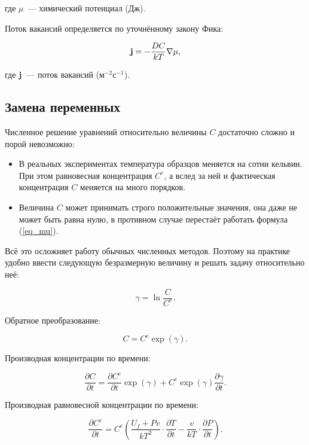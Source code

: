 \documentclass[12pt, a4paper]{article}
\begin{document}
\noindent где $\mu$~--- химический потенциал (Дж).

Поток вакансий определяется по уточнённому закону Фика:

\begin{equation}
\label{eq_fik}
{\bf j}=-\frac{DC}{kT}\nabla \mu,
\end{equation}

\noindent где ${\bf j}$~--- поток вакансий (м${}^{-2}$с${}^{-1}$).

\subsection{Замена переменных}

Численное решение уравнений относительно величины $C$ достаточно сложно и порой невозможно:

\begin{itemize}
\item В реальных экспериментах температура образцов меняется на сотни кельвин. При этом равновесная концентрация $C^e$, а вслед за ней и фактическая концентрация $C$ меняется на много порядков.
\item Величина $C$ может принимать строго положительные значения, она даже не может быть равна нулю, в противном случае перестаёт работать формула (\ref{eq_mu}).
\end{itemize}

Всё это осложняет работу обычных численных методов. Поэтому на практике удобно ввести следующую безразмерную величину и решать задачу относительно неё:

\begin{equation}
\label{eq_gamma}
\gamma = \ln{\frac{C}{C^e}}.
\end{equation}

Обратное преобразование:

\begin{equation}
\label{eq_c_from_gamma}
C = C^e \exp(\gamma).
\end{equation}

Производная концентрации по времени:

\begin{equation}
\label{eq_dc_dt_gamma}
\frac{\partial C}{\partial t} = \frac{\partial C^e}{\partial t} \exp(\gamma) + C^e \exp(\gamma) \frac{\partial \gamma}{\partial t}.
\end{equation}

Производная равновесной концентрации по времени:

\begin{equation}
\label{eq_dce_dt_gamma}
\frac{\partial C^e}{\partial t} = C^e \left( \frac{U_f + Pv}{kT^2} \cdot \frac{\partial T}{\partial t} - \frac{v}{kT} \cdot \frac{\partial P}{\partial t} \right).
\end{equation}
\end{document}
